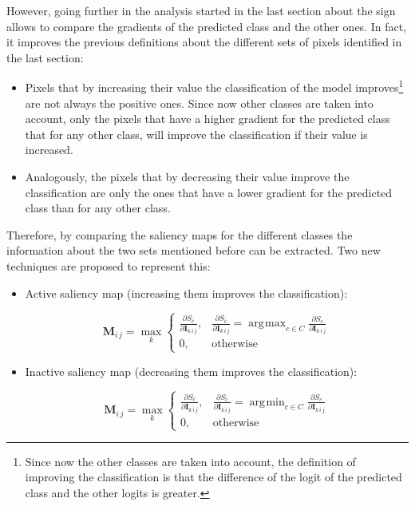 \documentclass[preprint,12pt]{elsarticle}
\DeclareMathOperator*{\argmax}{arg\!max}
\DeclareMathOperator*{\argmin}{arg\!min}
\begin{document}
However, going further in the analysis started in the last section about the sign allows to compare the gradients of the predicted class and the other ones. In fact, it improves the previous definitions about the different sets of pixels identified in the last section:

\begin{itemize}
    \item Pixels that by increasing their value the classification of the model improves\footnote{Since now the other classes are taken into account, the definition of improving the classification is that the difference of the logit of the predicted class and the other logits is greater.} are not always the positive ones. Since now other classes are taken into account, only the pixels that have a higher gradient for the predicted class that for any other class, will improve the classification if their value is increased.
    \item Analogously, the pixels that by decreasing their value improve the classification are only the ones that have a lower gradient for the predicted class than for any other class.
\end{itemize}

Therefore, by comparing the saliency maps for the different classes the information about the two sets mentioned before can be extracted. Two new techniques are proposed to represent this:

\begin{itemize}
    \item Active saliency map (increasing them improves the classification):
    
    \begin{equation}
      \boldsymbol{M}_{i\, j} = \max_{k}
        \begin{cases}
            \frac{\partial S_{\hat{c}}}{\partial \boldsymbol{I}_{k\, i\, j}}, & \frac{\partial S_{\hat{c}}}{\partial \boldsymbol{I}_{k\, i\, j}} = \argmax_{c \in C}\frac{\partial S_{c}}{\partial \boldsymbol{I}_{k\, i\, j}} \\
            0, & \text{otherwise}
        \end{cases}
        \label{eq: active saliency map}
    \end{equation}

    \item Inactive saliency map (decreasing them improves the classification):
    
    \begin{equation}
      \boldsymbol{M}_{i\, j} = \max_{k}
        \begin{cases}
            \frac{\partial S_{\hat{c}}}{\partial \boldsymbol{I}_{k\, i\, j}}, & \frac{\partial S_{\hat{c}}}{\partial \boldsymbol{I}_{k\, i\, j}} = \argmin_{c \in C}\frac{\partial S_{c}}{\partial \boldsymbol{I}_{k\, i\, j}} \\
            0, & \text{otherwise}
        \end{cases}
        \label{eq: inactive saliency map}
    \end{equation}

\end{itemize}
\end{document}
